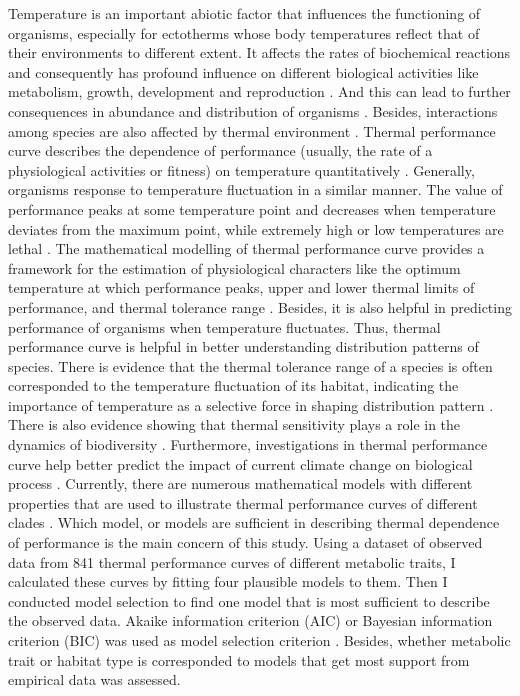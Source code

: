 \documentclass[11pt]{article}
\begin{document}
  Temperature is an important abiotic factor that influences the functioning of organisms, especially 
  for ectotherms whose body temperatures reflect that of their environments to different extent. It affects 
  the rates of biochemical reactions and consequently has profound influence on different biological 
  activities like metabolism, growth, development and reproduction \cite{sinclair2016can}. And this can 
  lead to further consequences in abundance and distribution of organisms \cite{schulte2011thermal}. 
  Besides, interactions among species are also affected by thermal environment \cite{grigaltchik2012thermal}.  
  \newline
  Thermal performance curve describes the dependence of performance (usually, the rate of a physiological 
  activities or fitness) on temperature quantitatively \cite{sinclair2016can}. Generally, organisms response 
  to temperature fluctuation in a similar manner. The value of performance peaks at some temperature point 
  and decreases when temperature deviates from the maximum point, while extremely high or low temperatures are lethal 
  \cite{sinclair2016can,krenek2011thermal}. 
  The mathematical modelling of thermal performance curve provides a framework for the estimation of 
  physiological characters like the optimum temperature at which performance peaks, upper and lower 
  thermal limits of performance, and thermal tolerance range \cite{krenek2011thermal}. 
  Besides, it is also helpful in predicting 
  performance of organisms when temperature fluctuates. Thus, thermal performance curve is helpful in better 
  understanding distribution patterns of species. There is evidence that 
  the thermal tolerance range of a species is often corresponded 
  to the temperature fluctuation of its habitat, indicating the 
  importance of temperature as a selective force in shaping distribution pattern \cite{sunday2011global, clusella2011climatic}. 
  There is also evidence showing 
  that thermal sensitivity plays a role in the dynamics of biodiversity \cite{allen2002global}. Furthermore, 
  investigations in thermal performance curve help better predict the impact of current climate change on 
  biological process \cite{krenek2011thermal, sears2011introduction}.  
  \newline
  Currently, there are numerous mathematical models with different properties  
  that are used to illustrate thermal performance curves of different clades 
  \cite{krenek2011thermal,angilletta2006estimating}. Which model, or models are sufficient in describing thermal dependence 
  of performance is the main concern of this study. 
  Using a dataset of observed data from 841 thermal performance curves of different metabolic traits, 
  I calculated these curves by fitting 
  four plausible models to them. 
  Then I conducted model selection to find one model that is most sufficient to describe the observed data. 
  Akaike information criterion (AIC) or 
  Bayesian information criterion (BIC) was used as model selection criterion \cite{johnson2004model}. 
  Besides, whether metabolic trait or habitat type is corresponded to models that get most support from 
  empirical data was assessed.
\end{document}
